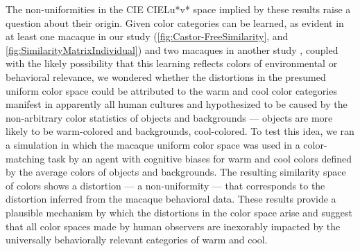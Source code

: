 The non-uniformities in the CIE CIELu*v* space implied by these results raise a question about their origin. 
Given color categories can be learned, as evident in at least one macaque in our study (\autoref{fig:Castor-FreeSimilarity}, and \autoref{fig:SimilarityMatrixIndividual}) and two macaques in another study \citep{panichello_error-correcting_2019}, coupled with the likely possibility that this learning reflects colors of environmental or behavioral relevance, we wondered whether the distortions in the presumed uniform color space could be attributed to the warm and cool color categories manifest in apparently all human cultures \citep{gibson_color_2017} and hypothesized to be caused by the non-arbitrary color statistics of objects and backgrounds \citep{rosenthal_color_2018}
— objects are more likely to be warm-colored and backgrounds, cool-colored. 
To test this idea, we ran a simulation in which the macaque uniform color space was used in a color-matching task by an agent with cognitive biases for warm and cool colors defined by the average colors of objects and backgrounds. 
The resulting similarity space of colors shows a distortion — a non-uniformity — that corresponds to the distortion inferred from the macaque behavioral data. 
These results provide a plausible mechanism by which the distortions in the color space arise and suggest that all color spaces made by human observers are inexorably impacted by the universally behaviorally relevant categories of warm and cool. 




